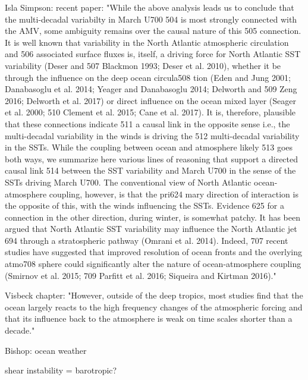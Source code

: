 Isla Simpson: recent paper:
"While the above analysis leads us to conclude that the multi-decadal variabilty in March U700 504 is most strongly connected with the AMV, some ambiguity remains over the causal nature of this 505 connection. It is well known that variability in the North Atlantic atmospheric circulation and 506 associated surface fluxes is, itself, a driving force for North Atlantic SST variability (Deser and 507 Blackmon 1993; Deser et al. 2010), whether it be through the influence on the deep ocean circula508
tion (Eden and Jung 2001; Danabasoglu et al. 2014; Yeager and Danabasoglu 2014; Delworth and 509 Zeng 2016; Delworth et al. 2017) or direct influence on the ocean mixed layer (Seager et al. 2000; 510 Clement et al. 2015; Cane et al. 2017). It is, therefore, plausible that these connections indicate 511 a causal link in the opposite sense i.e., the multi-decadal variability in the winds is driving the
512 multi-decadal variability in the SSTs. While the coupling between ocean and atmosphere likely 513 goes both ways, we summarize here various lines of reasoning  that support a directed causal link 514 between the SST variability and March U700 in the sense of the SSTs driving March U700.
The conventional view of North Atlantic ocean-atmosphere coupling, however, is that the pri624
mary direction of interaction is the opposite of this, with the winds influencing the SSTs. Evidence
625 for a connection in the other direction, during winter, is somewhat patchy. It has been argued that North Atlantic SST variability may influence the North Atlantic jet
694 through a stratospheric pathway (Omrani et al. 2014).  Indeed,
707 recent studies have suggested that improved resolution of ocean fronts and the overlying atmo708
sphere could significantly alter the nature of ocean-atmosphere coupling (Smirnov et al. 2015;
709 Parfitt et al. 2016; Siqueira and Kirtman 2016)."

Visbeck chapter: "However, outside of the deep
tropics, most studies find that the ocean largely reacts to the high frequency changes of the
atmospheric forcing and that its influence back to the atmosphere is weak on time scales shorter
than a decade."

Bishop: ocean weather

shear instability = barotropic?


